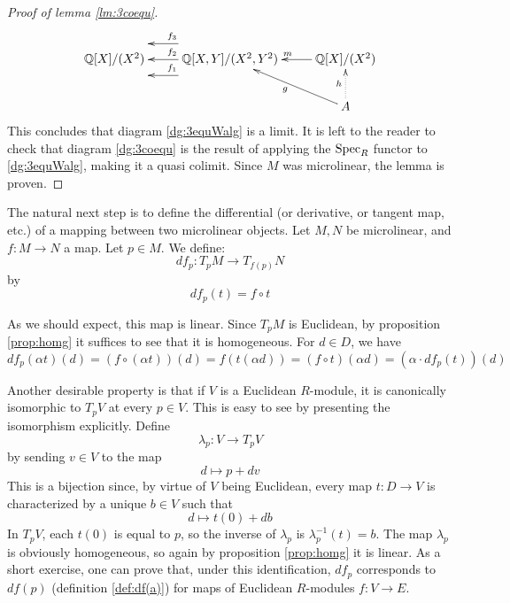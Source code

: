 \begin{proof}[Proof of lemma \ref{lm:3coequ}]
  \begin{equation*}
    \xymatrix{
      \Q[X]/(X^2) & \Q[X,Y]/(X^2,Y^2) \ar@<3ex>[l]_{f_1} \ar[l]_{f_2} \ar@<-3ex>[l]_{f_3} & \Q[X]/(X^2) \ar[l]_{m} \\
      &                                                                                   & A \ar[lu]^g \ar@{.>}[u]^h
    }
  \end{equation*}
  This concludes that diagram \ref{dg:3equWalg} is a limit. It is left to the reader to check that diagram \ref{dg:3coequ} is the result of applying the \( \operatorname{Spec}_R \) functor to \ref{dg:3equWalg}, making it a quasi colimit. Since \( M \) was microlinear, the lemma is proven.  
\end{proof}

The natural next step is to define the differential (or derivative, or tangent map, etc.) of a mapping between two microlinear objects. Let \( M,N \) be microlinear, and \( f:M\to N \) a map. Let \( p\in M \). We define:
\begin{equation*}
  df_p : T_pM\to T_{f(p)}N
\end{equation*}
by
\begin{equation*}
  df_p(t) = f\circ t
\end{equation*}

As we should expect, this map is linear. Since \( T_pM \) is Euclidean, by proposition \ref{prop:homg} it suffices to see that it is homogeneous. For \( d\in D \), we have
\begin{equation*} 
  df_p(\alpha t)(d) = (f\circ (\alpha t))(d) = f(t(\alpha d)) = (f\circ t)(\alpha d) = (\alpha \cdot df_p(t))(d)
\end{equation*}

Another desirable property is that if \( V \) is a Euclidean \( R \)-module, it is canonically isomorphic to \( T_pV \) at every \( p\in V \). This is easy to see by presenting the isomorphism explicitly. Define
\begin{equation*}
  \lambda_p:V\to T_pV
\end{equation*}
by sending \( v\in V \) to the map
\begin{equation*}
  d\mapsto p+dv
\end{equation*}
This is a bijection since, by virtue of \( V \) being Euclidean, every map \( t:D\to V \) is characterized by a unique \( b\in V \) such that
\begin{equation*}
  d\mapsto t(0)+db
\end{equation*}
In \( T_pV \), each \( t(0) \) is equal to \( p \), so the inverse of \( \lambda_p \) is \( \lambda_p^{-1}(t) = b \). The map \( \lambda_p \) is obviously homogeneous, so again by proposition \ref{prop:homg} it is linear. As a short exercise, one can prove that, under this identification, \( df_p \) corresponds to \( df(p) \) (definition \ref{def:df(a)}) for maps of Euclidean \( R \)-modules \( f:V\to E \).

